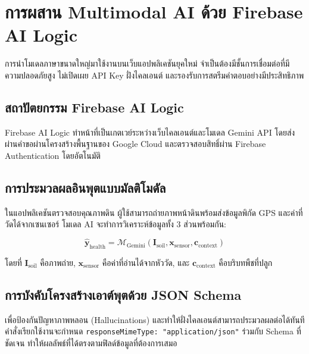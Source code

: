 \chapter{การผสาน Multimodal AI ด้วย Firebase AI Logic}

การนำโมเดลภาษาขนาดใหญ่มาใช้งานบนเว็บแอปพลิเคชันยุคใหม่ จำเป็นต้องมีชั้นการเชื่อมต่อที่มีความปลอดภัยสูง ไม่เปิดเผย API Key ฝั่งไคลเอนต์ และรองรับการสตรีมคำตอบอย่างมีประสิทธิภาพ

\section{สถาปัตยกรรม Firebase AI Logic}

Firebase AI Logic ทำหน้าที่เป็นเกตเวย์ระหว่างเว็บไคลเอนต์และโมเดล Gemini API โดยส่งผ่านคำขอผ่านโครงสร้างพื้นฐานของ Google Cloud และตรวจสอบสิทธิ์ผ่าน Firebase Authentication โดยอัตโนมัติ

\section{การประมวลผลอินพุตแบบมัลติโมดัล}

ในแอปพลิเคชันตรวจสอบคุณภาพดิน ผู้ใช้สามารถถ่ายภาพหน้าดินพร้อมส่งข้อมูลพิกัด GPS และค่าที่วัดได้จากเซนเซอร์ โมเดล AI จะทำการวิเคราะห์ข้อมูลทั้ง 3 ส่วนพร้อมกัน:

\begin{equation}
\mathbf{\hat{y}}_{\text{health}} = \mathcal{M}_{\text{Gemini}}(\mathbf{I}_{\text{soil}}, \mathbf{x}_{\text{sensor}}, \mathbf{c}_{\text{context}})
\end{equation}

โดยที่ $\mathbf{I}_{\text{soil}}$ คือภาพถ่าย, $\mathbf{x}_{\text{sensor}}$ คือค่าที่อ่านได้จากหัววัด, และ $\mathbf{c}_{\text{context}}$ คือบริบทพืชที่ปลูก

\section{การบังคับโครงสร้างเอาต์พุตด้วย JSON Schema}

เพื่อป้องกันปัญหาภาพหลอน (Hallucinations) และทำให้ฝั่งไคลเอนต์สามารถประมวลผลต่อได้ทันที คำสั่งเรียกใช้งานจะกำหนด \texttt{responseMimeType: "application/json"} ร่วมกับ Schema ที่ชัดเจน ทำให้ผลลัพธ์ที่ได้ตรงตามฟิลด์ข้อมูลที่ต้องการเสมอ
